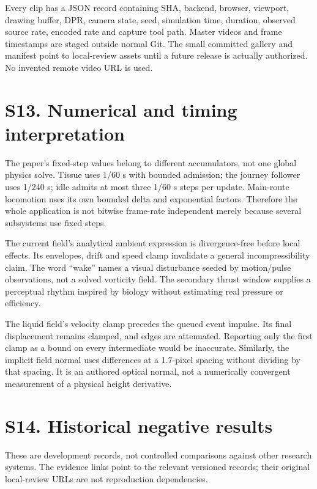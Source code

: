 \documentclass[
  english,
  11pt,
]{article}
\begin{document}
Every clip has a JSON record containing SHA, backend, browser, viewport,
drawing buffer, DPR, camera state, seed, simulation time, duration,
observed source rate, encoded rate and capture tool path. Master videos
and frame timestamps are staged outside normal Git. The small committed
gallery and manifest point to local-review assets until a future release
is actually authorized. No invented remote video URL is used.

\section{S13. Numerical and timing
interpretation}\label{s13.-numerical-and-timing-interpretation}

The paper's fixed-step values belong to different accumulators, not one
global physics solve. Tissue uses 1/60 s with bounded admission; the
journey follower uses 1/240 s; idle admits at most three 1/60 s steps
per update. Main-route locomotion uses its own bounded delta and
exponential factors. Therefore the whole application is not bitwise
frame-rate independent merely because several subsystems use fixed
steps.

The current field's analytical ambient expression is divergence-free
before local effects. Its envelopes, drift and speed clamp invalidate a
general incompressibility claim. The word ``wake'' names a visual
disturbance seeded by motion/pulse observations, not a solved vorticity
field. The secondary thrust window supplies a perceptual rhythm inspired
by biology without estimating real pressure or efficiency.

The liquid field's velocity clamp precedes the queued event impulse. Its
final displacement remains clamped, and edges are attenuated. Reporting
only the first clamp as a bound on every intermediate would be
inaccurate. Similarly, the implicit field normal uses differences at a
1.7-pixel spacing without dividing by that spacing. It is an authored
optical normal, not a numerically convergent measurement of a physical
height derivative.

\section{S14. Historical negative
results}\label{s14.-historical-negative-results}

These are development records, not controlled comparisons against other
research systems. The evidence links point to the relevant versioned
records; their original local-review URLs are not reproduction
dependencies.
\end{document}
